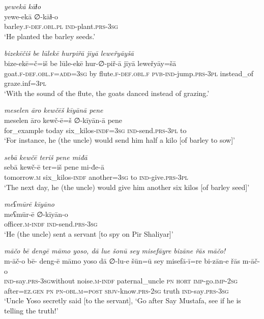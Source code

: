 \ea \label{ŽP.36}
\textit{yewekā kāɫo} \\ 
\gll yewe-ekā ∅-kāɫ-o \\ 
 barley\textsc{.f}\textsc{-def}\textsc{.obl}\textsc{.pl} \textsc{ind-}plant\textsc{.prs}\textsc{-3sg} \\ 
\glt `He planted the barley seeds.'
\z 
 
\ea \label{ŽP.37}
\textit{bizekēčiš be lūlekē hurpiřā jīyā leweřyāyšā} \\ 
\gll bize-ekē=č=iš be lūle-ekē hur-∅-piř-ā jīyā leweřyāy=šā \\ 
 goat\textsc{.f}\textsc{-def}\textsc{.obl}\textsc{.f}\textsc{=add}\textsc{=3sg} by flute\textsc{.f}\textsc{-def}\textsc{.obl}\textsc{.f} \textsc{pvb-}\textsc{ind-}jump\textsc{.prs}\textsc{-3pl} instead\_of graze.inf\textsc{=3pl} \\ 
\glt `With the sound of the flute, the goats danced instead of grazing.'
\z 
 
\ea \label{ŽP.38}
\textit{meselen āro kewčēš kīyānā pene} \\ 
\gll meselen āro kewč-ē=š ∅-kīyān-ā pene \\ 
 for\_example today six\_kilos\textsc{-indf}\textsc{=3sg} \textsc{ind-}send\textsc{.prs}\textsc{-3pl} to \\ 
\glt `For instance, he (the uncle) would send him half a kilo [of barley to sow]'
\z 
 
\ea \label{ŽP.41}
\textit{sebā kewčē teriš pene miđā} \\ 
\gll sebā kewč-ē ter=iš pene mi-đe-ā \\ 
 tomorrow\textsc{.m} six\_kilos\textsc{-indf} another\textsc{=3sg} to \textsc{ind-}give\textsc{.prs}\textsc{-3pl} \\ 
\glt `The next day, he (the uncle) would give him another six kilos [of barley seed]'
\z 
 
\ea \label{ŽP.42}
\textit{meʕmūrē kīyāno} \\ 
\gll meʕmūr-ē ∅-kīyān-o \\ 
 officer\textsc{.m}\textsc{-indf} \textsc{ind-}send\textsc{.prs}\textsc{-3sg} \\ 
\glt `He (the uncle) sent a servant [to spy on Pir Shaliyar]'
\z 
 
\ea \label{ŽP.43}
\textit{māčo bē dengē māmo yoso, dā lue šonū sey misefāyre bizāne řās māčo!} \\ 
\gll m-āč-o bē- deng-ē māmo yoso dā ∅-lu-e šūn=ū sey misefā-ī=re bi-zān-e řās m-āč-o \\ 
 \textsc{ind-}say\textsc{.prs}\textsc{-3sg}without noise\textsc{.m}\textsc{-indf} paternal\_uncle \textsc{pn} \textsc{hort} \textsc{imp-}go.\textsc{imp-}\textsc{2sg} after\textsc{\textsc{=ez.gen}} \textsc{pn} \textsc{pn}\textsc{-obl}\textsc{.m}\textsc{=\textsc{post}} \textsc{sbjv-}know\textsc{.prs}-\textsc{2sg} truth \textsc{ind-}say\textsc{.prs}\textsc{-3sg} \\ 
\glt `Uncle Yoso secretly said [to the servant], ‘Go after Say Mustafa, see if he is telling the truth!'
\z 
 
